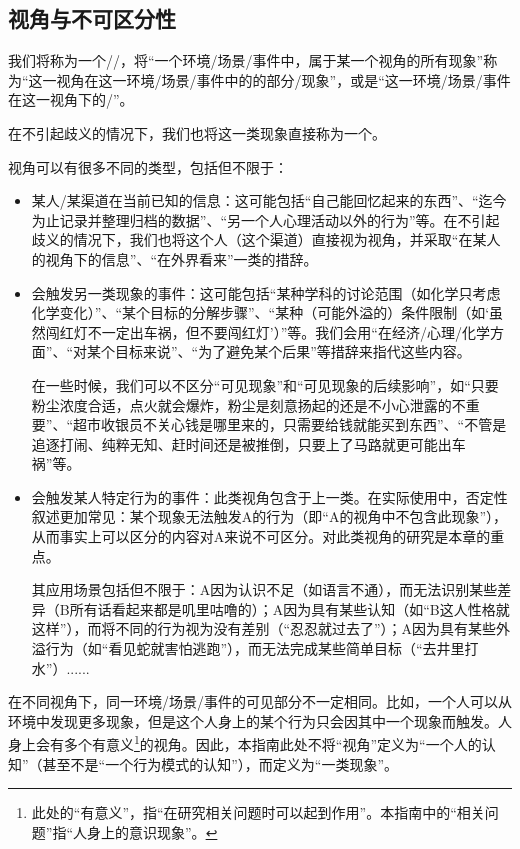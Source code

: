 
\subsection{视角与不可区分性}
我们将称为一个//，将“一个环境/场景/事件中，属于某一个视角的所有现象”称为“这一视角在这一环境/场景/事件中的的部分/现象”，或是“这一环境/场景/事件在这一视角下的/”。
\begin{explain}
在不引起歧义的情况下，我们也将这一类现象直接称为一个。

视角可以有很多不同的类型，包括但不限于：
\begin{itemize}
\item 某人/某渠道在当前已知的信息：这可能包括“自己能回忆起来的东西”、“迄今为止记录并整理归档的数据”、“另一个人心理活动以外的行为”等。在不引起歧义的情况下，我们也将这个人（这个渠道）直接视为视角，并采取“在某人的视角下的信息”、“在外界看来”一类的措辞。
\item 会触发另一类现象的事件：这可能包括“某种学科的讨论范围（如化学只考虑化学变化）”、“某个目标的分解步骤”、“某种（可能外溢的）条件限制（如‘虽然闯红灯不一定出车祸，但不要闯红灯’）”等。我们会用“在经济/心理/化学方面”、“对某个目标来说”、“为了避免某个后果”等措辞来指代这些内容。

在一些时候，我们可以不区分“可见现象”和“可见现象的后续影响”，如“只要粉尘浓度合适，点火就会爆炸，粉尘是刻意扬起的还是不小心泄露的不重要”、“超市收银员不关心钱是哪里来的，只需要给钱就能买到东西”、“不管是追逐打闹、纯粹无知、赶时间还是被推倒，只要上了马路就更可能出车祸”等。
\item 会触发某人特定行为的事件：此类视角包含于上一类。在实际使用中，否定性叙述更加常见：某个现象无法触发A的行为（即“A的视角中不包含此现象”），从而事实上可以区分的内容对A来说不可区分。对此类视角的研究是本章的重点。

其应用场景包括但不限于：A因为认识不足（如语言不通），而无法识别某些差异（B所有话看起来都是叽里咕噜的）；A因为具有某些认知（如“B这人性格就这样”），而将不同的行为视为没有差别（“忍忍就过去了”）；A因为具有某些外溢行为（如“看见蛇就害怕逃跑”），而无法完成某些简单目标（“去井里打水”）......
\end{itemize}
在不同视角下，同一环境/场景/事件的可见部分不一定相同。比如，一个人可以从环境中发现更多现象，但是这个人身上的某个行为只会因其中一个现象而触发。人身上会有多个有意义\footnote{此处的“有意义”，指“在研究相关问题时可以起到作用”。本指南中的“相关问题”指“人身上的意识现象”。}的视角。因此，本指南此处不将“视角”定义为“一个人的认知”（甚至不是“一个行为模式的认知”），而定义为“一类现象”。
\end{explain}

